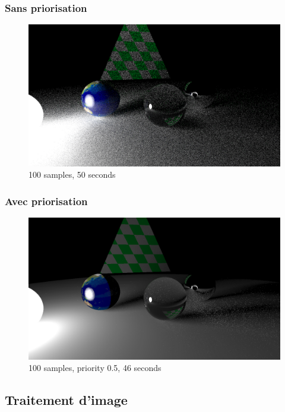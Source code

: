 \documentclass[handout]{beamer}
\begin{document}
\begin{frame}
    \frametitle{Sans priorisation}

    \begin{figure}
        \includegraphics[scale=0.25]{night.png}
        \caption{100 samples, 50 seconds}
    \end{figure}

\end{frame}

\begin{frame}
    \frametitle{Avec priorisation}

    \begin{figure}
        \includegraphics[scale=0.25]{priorisation.png}
        \caption{100 samples, priority 0.5, 46 seconds}
    \end{figure}

\end{frame}

\subsection{Traitement d'image}
\end{document}
